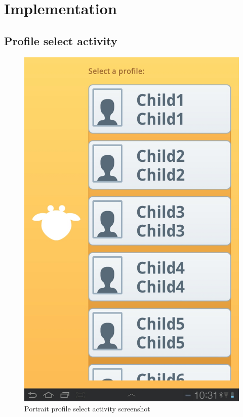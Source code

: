 \appendix
\chapter{Implementation}
\section{Profile select activity}
\begin{figure}[h!]
	\centering
	\includegraphics[scale=0.3]{gfx/profile-select-activity_1.jpg}
	\caption{Portrait profile select activity screenshot}
	\label{fig:profile-select-activity}
\end{figure}
